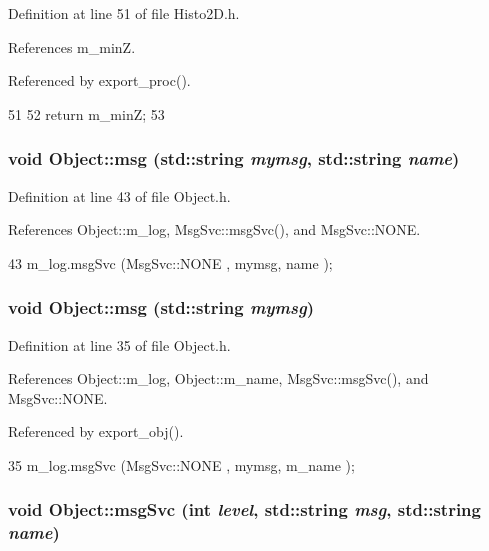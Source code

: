 Definition at line 51 of file Histo2D.h.

References m\_\-minZ.

Referenced by export\_\-proc().


\begin{DoxyCode}
51                {
52     return m_minZ;
53   }
\end{DoxyCode}
\hypertarget{classObject_ac5d59299273cee27aacf7de00d2e7034}{
\subsubsection[{msg}]{\setlength{\rightskip}{0pt plus 5cm}void Object::msg (std::string {\em mymsg}, \/  std::string {\em name})}}
\label{classObject_ac5d59299273cee27aacf7de00d2e7034}


Definition at line 43 of file Object.h.

References Object::m\_\-log, MsgSvc::msgSvc(), and MsgSvc::NONE.


\begin{DoxyCode}
43 { m_log.msgSvc (MsgSvc::NONE    , mymsg, name ); }
\end{DoxyCode}
\hypertarget{classObject_a58b2d0618c2d08cf2383012611528d97}{
\subsubsection[{msg}]{\setlength{\rightskip}{0pt plus 5cm}void Object::msg (std::string {\em mymsg})}}
\label{classObject_a58b2d0618c2d08cf2383012611528d97}


Definition at line 35 of file Object.h.

References Object::m\_\-log, Object::m\_\-name, MsgSvc::msgSvc(), and MsgSvc::NONE.

Referenced by export\_\-obj().


\begin{DoxyCode}
35 { m_log.msgSvc (MsgSvc::NONE    , mymsg, m_name ); }
\end{DoxyCode}
\hypertarget{classObject_a3f9d5537ebce0c0f2bf6ae4d92426f3c}{
\subsubsection[{msgSvc}]{\setlength{\rightskip}{0pt plus 5cm}void Object::msgSvc (int {\em level}, \/  std::string {\em msg}, \/  std::string {\em name})}}
\label{classObject_a3f9d5537ebce0c0f2bf6ae4d92426f3c}


